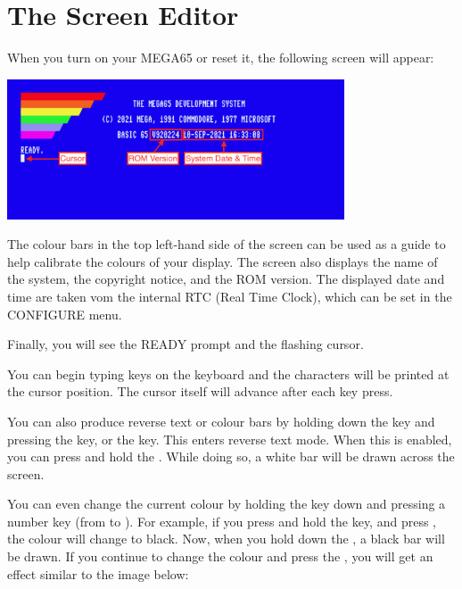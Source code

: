 \section{The Screen Editor}
\label{sec:screen-editor}

When you turn on your MEGA65 or reset it, the following screen will appear:

\begin{center}
\includegraphics[width={10cm}]{images/introduction-screen/layout.png}
\end{center}

The colour bars in the top left-hand side of the screen can be used
as a guide to help calibrate the colours of your display.
The screen also displays the name of the system,
the copyright notice, and the ROM version.
The displayed date and time are taken vom the internal RTC
(Real Time Clock), which can be set in the CONFIGURE menu.

Finally, you will see the READY prompt and the flashing cursor.

You can begin typing keys on the keyboard and the characters will be
printed at the cursor position. The cursor itself will advance after
each key press.

You can also produce reverse text or colour bars by holding down the  key and pressing the  key, or the  key. This enters reverse text mode. When this is enabled, you can press and hold the . While doing so, a white bar will be drawn across the screen.

You can even change the current colour by holding the  key down and pressing a number key (from  to ). For example, if you press and hold the  key, and press , the colour will change to black. Now, when you hold down the , a black bar will be drawn. If you continue to change the colour and press the , you will get an effect similar to the image below:


